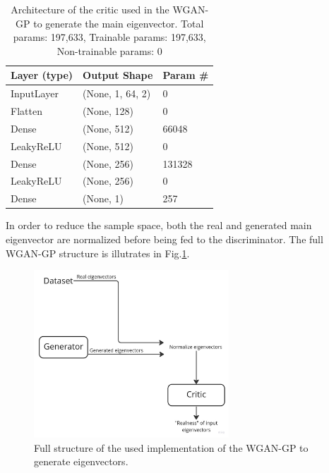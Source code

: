 \documentclass{article}
\begin{document}
\begin{table}[]
    \begin{tabular}{|l|l|l|}
        \hline
        \textbf{Layer (type)} & \textbf{Output Shape} & \textbf{Param \#} \\ \hline
        InputLayer            & (None, 1, 64, 2)      & 0                 \\ \hline
        Flatten               & (None, 128)           & 0                 \\ \hline
        Dense                 & (None, 512)           & 66048             \\ \hline
        LeakyReLU             & (None, 512)           & 0                 \\ \hline
        Dense                 & (None, 256)           & 131328            \\ \hline
        LeakyReLU             & (None, 256)           & 0                 \\ \hline
        Dense                 & (None, 1)             & 257               \\ \hline
    \end{tabular}
    \caption{Architecture of the critic used in the WGAN-GP to generate the main eigenvector. Total params: 197,633, Trainable params: 197,633, Non-trainable params: 0}
    \label{tab:main_evec_critic_WGANGP_architecture}
\end{table}



In order to reduce the sample space, both the real and generated main eigenvector are normalized before being fed to the discriminator. The full WGAN-GP structure is illutrates in Fig.\ref{fig:evecs_wgangp_full_structure}.


\begin{figure}
    \centering
    \includegraphics[width=0.65\textwidth]{../figs/evecs_wgangp_full_structure.jpg}
    \caption{Full structure of the used implementation of the WGAN-GP to generate eigenvectors.}
    \label{fig:evecs_wgangp_full_structure}
\end{figure}
\end{document}
